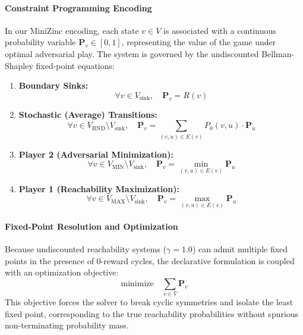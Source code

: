 \documentclass{article}
\begin{document}
\paragraph{Constraint Programming Encoding}
In our MiniZinc encoding, each state $v \in V$ is associated with a continuous probability variable $\mathbf{P}_v \in [0, 1]$, representing the value of the game under optimal adversarial play. The system is governed by the undiscounted Bellman-Shapley fixed-point equations:

\begin{enumerate}
    \item \textbf{Boundary Sinks:}
    \begin{equation}
    \forall v \in V_{\text{sink}}, \quad \mathbf{P}_v = R(v)
    \end{equation}
    
    \item \textbf{Stochastic (Average) Transitions:}
    \begin{equation}
    \forall v \in V_{\text{RND}} \setminus V_{\text{sink}}, \quad \mathbf{P}_v = \sum_{(v, u) \in E(v)} P_0(v, u) \cdot \mathbf{P}_u
    \end{equation}
    
    \item \textbf{Player 2 (Adversarial Minimization):}
    \begin{equation}
    \forall v \in V_{\text{MIN}} \setminus V_{\text{sink}}, \quad \mathbf{P}_v = \min_{(v, u) \in E(v)} \mathbf{P}_u
    \end{equation}
    
    \item \textbf{Player 1 (Reachability Maximization):}
    \begin{equation}
    \forall v \in V_{\text{MAX}} \setminus V_{\text{sink}}, \quad \mathbf{P}_v = \max_{(v, u) \in E(v)} \mathbf{P}_u
    \end{equation}
\end{enumerate}

\paragraph{Fixed-Point Resolution and Optimization}
Because undiscounted reachability systems ($\gamma = 1.0$) can admit multiple fixed points in the presence of 0-reward cycles, the declarative formulation is coupled with an optimization objective:
\begin{equation}
\text{minimize} \quad \sum_{v \in V} \mathbf{P}_v
\end{equation}
This objective forces the solver to break cyclic symmetries and isolate the least fixed point, corresponding to the true reachability probabilities without spurious non-terminating probability mass.
\end{document}
